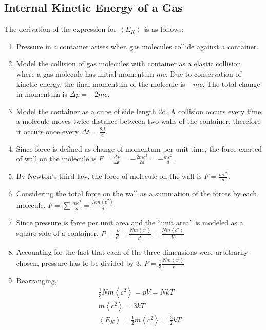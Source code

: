 \documentclass[../main]{subfiles}
\begin{document}


	\subsection{Internal Kinetic Energy of a Gas}


	The derivation of the expression for \(\left< E_K \right>\) is as follows:

	\begin{enumerate}
		\item Pressure in a container arises when gas molecules collide against a container.
		\item Model the collision of gas molecules with container as a elastic collision, where a gas molecule has initial momentum \(mc\). Due to conservation of kinetic energy, the final momentum of the molecule is \(-mc\). The total change in momentum is \(\Delta p = -2mc\).
		\item Model the container as a cube of side length 2d. A collision occurs every time a molecule moves twice distance between two walls of the container, therefore it occurs once every \(\Delta t = \frac{2d}{c}\).
		\item Since force is defined as change of momentum per unit time, the force exerted of wall on the molecule is \(F = \frac{\Delta p}{\Delta t} = -\frac{2mc^2}{2d} = -\frac{mc^2}{d}\).
		\item By Newton's third law, the force of molecule on the wall is \(F = \frac{mc^2}{d}\).
		\item Considering the total force on the wall as a summation of the forces by each molecule, \(F = \sum \frac{mc^2}{d} = \frac{Nm\left<c^2\right>}{d}\)
		\item Since pressure is force per unit area and the ``unit area'' is modeled as a square side of a container, \(P = \frac{F}{d} = \frac{Nm\left<c^2\right>}{d^3} = \frac{Nm\left<c^2\right>}{V}\)
		\item Accounting for the fact that each of the three dimensions were arbitrarily chosen, pressure has to be divided by 3. \(P = \frac{1}{3}\frac{Nm\left<c^2\right>}{V}\)
		\item Rearranging,
		\begin{equation*} \begin{gathered}
			\frac{1}{3} Nm\left<c^2\right> = pV = NkT \\
			m\left<c^2\right> = 3kT \\
			\left<E_K\right> = \frac{1}{2} m\left<c^2\right> = \frac{3}{2} kT
		\end{gathered} \end{equation*}
	\end{enumerate}
\end{document}
